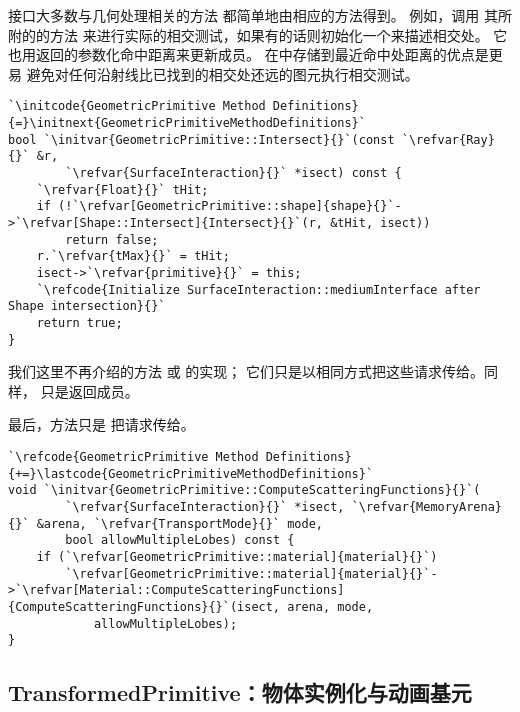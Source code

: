 接口大多数与几何处理相关的方法
都简单地由相应的方法得到。
例如，调用
其所附的的方法
来进行实际的相交测试，如果有的话则初始化一个来描述相交处。
它也用返回的参数化命中距离来更新成员。
在中存储到最近命中处距离的优点是更易
避免对任何沿射线比已找到的相交处还远的图元执行相交测试。
\begin{lstlisting}
`\initcode{GeometricPrimitive Method Definitions}{=}\initnext{GeometricPrimitiveMethodDefinitions}`
bool `\initvar{GeometricPrimitive::Intersect}{}`(const `\refvar{Ray}{}` &r,
        `\refvar{SurfaceInteraction}{}` *isect) const {
    `\refvar{Float}{}` tHit;
    if (!`\refvar[GeometricPrimitive::shape]{shape}{}`->`\refvar[Shape::Intersect]{Intersect}{}`(r, &tHit, isect))
        return false;
    r.`\refvar{tMax}{}` = tHit;
    isect->`\refvar{primitive}{}` = this;
    `\refcode{Initialize SurfaceInteraction::mediumInterface after Shape intersection}{}`
    return true;
}
\end{lstlisting}

我们这里不再介绍的方法
或\linebreak
{}的实现；
它们只是以相同方式把这些请求传给。同样，\linebreak
{}只是返回成员。

最后，方法只是
把请求传给。
\begin{lstlisting}
`\refcode{GeometricPrimitive Method Definitions}{+=}\lastcode{GeometricPrimitiveMethodDefinitions}`
void `\initvar{GeometricPrimitive::ComputeScatteringFunctions}{}`(
        `\refvar{SurfaceInteraction}{}` *isect, `\refvar{MemoryArena}{}` &arena, `\refvar{TransportMode}{}` mode,
        bool allowMultipleLobes) const {
    if (`\refvar[GeometricPrimitive::material]{material}{}`)
        `\refvar[GeometricPrimitive::material]{material}{}`->`\refvar[Material::ComputeScatteringFunctions]{ComputeScatteringFunctions}{}`(isect, arena, mode,
            allowMultipleLobes);
}
\end{lstlisting}

\subsection{TransformedPrimitive：物体实例化与动画基元}\label{sub:TransformedPrimitive：物体实例化与动画基元}
